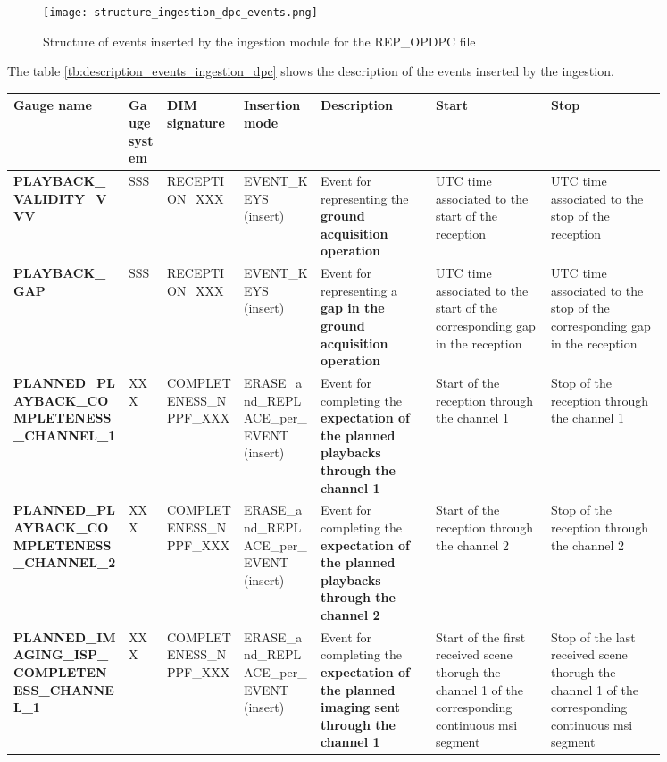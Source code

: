 \begin{figure}[H]
  \begin{center}
	\centering\texttt{[image: structure\_ingestion\_dpc\_events.png]}
	\caption{Structure of events inserted by the ingestion module for the REP\_OPDPC file}
	\label{fg:structure_ingestion_dpc_events}
  \end{center}
\end{figure}

The table \ref{tb:description_events_ingestion_dpc} shows the description of the events inserted by the ingestion.

\begin{landscape}
\begin{longtable}{|M{0.15\linewidth}|M{0.05\linewidth}|M{0.10\linewidth}|M{0.10\linewidth}|M{0.15\linewidth}|M{0.15\linewidth}|M{0.15\linewidth}|}
\hline \textbf{Gauge name} & \textbf{Gauge system} & \textbf{DIM signature} & \textbf{Insertion mode} & \textbf{Description} & \textbf{Start} & \textbf{Stop} \\ \hline
\textbf{PLAYBACK\_VALIDITY\_VVV} & SSS & \- RECEPTION\_XXX & EVENT\_KEYS (insert) & Event for representing the \textbf{ground acquisition operation} & UTC time associated to the start of the reception & UTC time associated to the stop of the reception \\ \hline
\textbf{PLAYBACK\_GAP} & SSS & \- RECEPTION\_XXX & EVENT\_KEYS (insert) & Event for representing a \textbf{gap in the ground acquisition operation} & UTC time associated to the start of the corresponding gap in the reception & UTC time associated to the stop of the corresponding gap in the reception \\ \hline
\textbf{PLANNED\_PLAYBACK\_COMPLETENESS\_CHANNEL\_1} & XXX & \- COMPLETENESS\_NPPF\_XXX & ERASE\_and\_REPLACE\_per\_EVENT (insert) & Event for completing the \textbf{expectation of the planned playbacks through the channel 1} & Start of the reception through the channel 1 & Stop of the reception through the channel 1 \\ \hline
\textbf{PLANNED\_PLAYBACK\_COMPLETENESS\_CHANNEL\_2} & XXX & \- COMPLETENESS\_NPPF\_XXX & ERASE\_and\_REPLACE\_per\_EVENT (insert) & Event for completing the \textbf{expectation of the planned playbacks through the channel 2} & Start of the reception through the channel 2 & Stop of the reception through the channel 2 \\ \hline
\textbf{PLANNED\_IMAGING\_ISP\_COMPLETENESS\_CHANNEL\_1} & XXX & \- COMPLETENESS\_NPPF\_XXX & ERASE\_and\_REPLACE\_per\_EVENT (insert) & Event for completing the \textbf{expectation of the planned imaging sent through the channel 1} & Start of the first received scene thorugh the channel 1 of the corresponding continuous \acrshort{msi} segment & Stop of the last received scene thorugh the channel 1 of the corresponding continuous \acrshort{msi} segment \\ \hline

\end{longtable}
\end{landscape}
